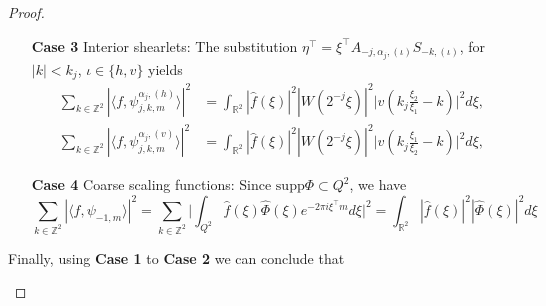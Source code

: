 \begin{proof}
\begin{itemize}
\begin{enumerate}
\item[\textbf{Case 3}] Interior shearlets: The substitution $\eta^{\top}=\xi^{\top}A_{-j,\alpha_j,(\iota)}S_{-k,(\iota)}$, for $|k|<k_j$, $\iota\in\{h,v\}$ yields
$$
\begin{aligned}
\sum_{k\in\mathbb{Z}^2}|\langle f,\psi_{j,k,m}^{\alpha_j,(h)}\rangle |^2 &= \int_{\mathbb{R}^2}|\hat{f}(\xi)|^2|W(2^{-j}\xi)|^2 \bigg|v\left(k_j\frac{\xi_2}{\xi_1}-k\right)\bigg|^2d\xi,\\
\sum_{k\in\mathbb{Z}^2}|\langle f,\psi_{j,k,m}^{\alpha_j,(v)}\rangle |^2 &= \int_{\mathbb{R}^2}|\hat{f}(\xi)|^2|W(2^{-j}\xi)|^2\bigg|v\left(k_j\frac{\xi_1}{\xi_2}-k\right)\bigg|^2d\xi,
\end{aligned}
$$

\item[\textbf{Case 4}] Coarse scaling functions: Since $\text{supp}\Phi\subset Q^2$, we have
$$
\sum_{k\in\mathbb{Z}^2}|\langle f,\psi_{-1,m}\rangle|^2=\sum_{k\in\mathbb{Z}^2}\bigg| \int_{Q^2}\hat{f}(\xi)\hat{\Phi}(\xi) e^{-2\pi i\xi^{\top}m}d\xi\bigg|^2 = \int_{\mathbb{R}^2}|\hat{f}(\xi)|^2|\hat{\Phi}(\xi)|^2d\xi
$$
\end{enumerate}
Finally, using \textbf{Case 1} to \textbf{Case 2} we can conclude that 


\end{itemize}
\end{proof}
